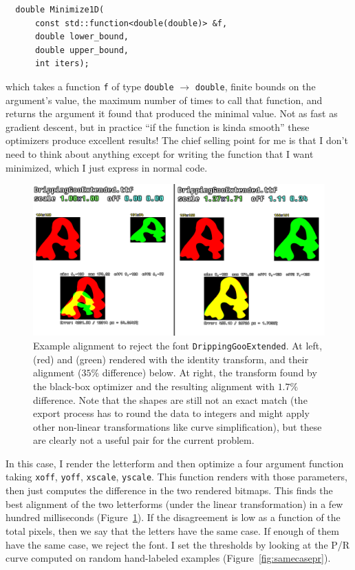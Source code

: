 \documentclass[twocolumn]{amsart}
\begin{document}
\begin{verbatim}
  double Minimize1D(
      const std::function<double(double)> &f,
      double lower_bound,
      double upper_bound,
      int iters);
\end{verbatim}

which takes a function \verb+f+ of type \verb+double+ $\rightarrow$
\verb+double+, finite bounds on the argument's value, the maximum
number of times to call that function, and returns the argument it
found that produced the minimal value. Not as fast as gradient
descent, but in practice ``if the function is kinda smooth'' these
optimizers produce excellent results! The chief selling point for me
is that I don't need to think about anything except for writing the
function that I want minimized, which I just express in normal code.

\begin{figure}[ht]
\includegraphics[width=0.9 \linewidth]{casealignment}
\caption{ Example alignment to reject the font
  {\tt DrippingGooExtended}.
  At left,  (red) and
   (green) rendered with the identity transform, and
  their alignment ($35\%$ difference) below. At right, the transform
  found by the black-box optimizer and the resulting alignment with
  $1.7\%$ difference. Note that the shapes are still not an exact
  match (the export process has to round the data to integers and
  might apply other non-linear transformations like curve
  simplification), but these are clearly not a useful pair for
  the current problem.} \label{fig:casealignment}
\end{figure}

In this case, I render the letterform  and then optimize
a four argument function taking {\tt xoff}, {\tt yoff}, {\tt xscale},
{\tt yscale}. This function renders  with those
parameters, then just computes the difference in the two rendered
bitmaps. This finds the best alignment of the two letterforms (under
the linear transformation) in a few hundred milliseconds
(Figure~\ref{fig:casealignment}). If the disagreement is low as a
function of the total pixels, then we say that the letters have the
same case. If enough of them have the same case, we reject the font. I
set the thresholds by looking at the P/R curve computed on random
hand-labeled examples (Figure~\ref{fig:samecasepr}).
\end{document}
